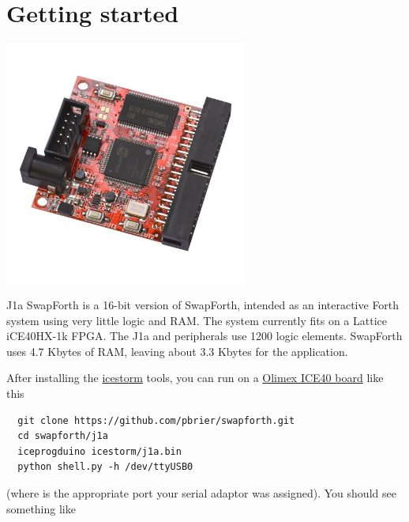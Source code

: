 \endgroup

\thispagestyle{empty}
\pagestyle{headings}

\tableofcontents

\chapter{Getting started}

\begin{center}
\includegraphics[width=0.6\textwidth]{iCE40HX1K-EVB-1.jpg}
\end{center}

J1a SwapForth is a 16-bit version of SwapForth,
intended as an interactive Forth system using very little logic and RAM.
The system currently fits on a Lattice iCE40HX-1k FPGA. 
The J1a and peripherals use 1200 logic elements.
SwapForth uses 4.7 Kbytes of RAM,
leaving about 3.3 Kbytes for the application. 

After installing the    
\href{http://www.clifford.at/icestorm/}{icestorm}
tools, you can run on a
\href{https://www.olimex.com/Products/FPGA/iCE40/iCE40HX1K-EVB/open-source-hardware}{Olimex ICE40 board}
like this

\begin{framed}
\begin{Verbatim}
  git clone https://github.com/pbrier/swapforth.git
  cd swapforth/j1a
  iceprogduino icestorm/j1a.bin
  python shell.py -h /dev/ttyUSB0
\end{Verbatim}
\end{framed}

\noindent
(where  is the appropriate port your serial adaptor was assigned).
You should see something like

